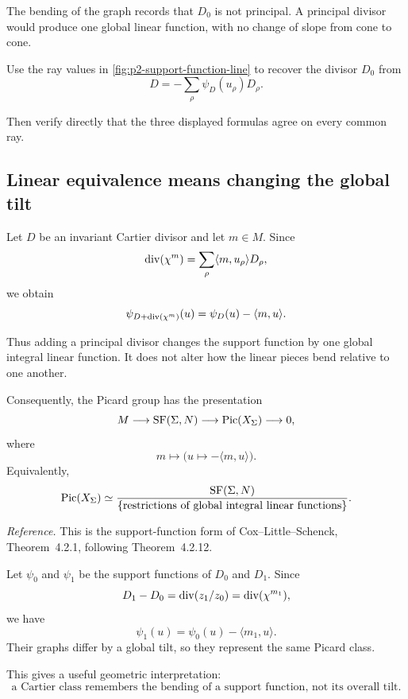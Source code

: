 The bending of the graph records that \(D_0\) is not principal. A
principal divisor would produce one global linear function, with no
change of slope from cone to cone.

\begin{pauseandthink}
Use the ray values in
\cref{fig:p2-support-function-line} to recover the divisor \(D_0\)
from
\[
D=-\sum_\rho\psi_D(u_\rho)D_\rho.
\]

Then verify directly that the three displayed formulas agree on every
common ray.
\end{pauseandthink}

\subsection{Linear equivalence means changing the global tilt}

Let \(D\) be an invariant Cartier divisor and let \(m\in M\). Since
\[
\operatorname{div}(\chi^{m})
=
\sum_\rho\langle m,u_\rho\rangle D_\rho,
\]
we obtain
\[
\psi_{D+\operatorname{div}(\chi^{m})}(u)
=
\psi_D(u)-\langle m,u\rangle.
\]

Thus adding a principal divisor changes the support function by one
global integral linear function. It does not alter how the linear
pieces bend relative to one another.

Consequently, the Picard group has the presentation
\[
M
\longrightarrow
\operatorname{SF}(\Sigma,N)
\longrightarrow
\operatorname{Pic}(X_\Sigma)
\longrightarrow
0,
\]
where
\[
m\longmapsto
\bigl(u\longmapsto-\langle m,u\rangle\bigr).
\]
Equivalently,
\[
\operatorname{Pic}(X_\Sigma)
\simeq
\frac{\operatorname{SF}(\Sigma,N)}
{\{\text{restrictions of global integral linear functions}\}}.
\]

\noindent
\textit{Reference.}
This is the support-function form of Cox--Little--Schenck,
Theorem~4.2.1, following Theorem~4.2.12.

\begin{example}
Let \(\psi_0\) and \(\psi_1\) be the support functions of \(D_0\) and
\(D_1\). Since
\[
D_1-D_0
=
\operatorname{div}(z_1/z_0)
=
\operatorname{div}(\chi^{m_1}),
\]
we have
\[
\psi_1(u)
=
\psi_0(u)-\langle m_1,u\rangle.
\]
Their graphs differ by a global tilt, so they represent the same
Picard class.
\end{example}

This gives a useful geometric interpretation:
\[
\boxed{
\text{a Cartier class remembers the bending of a support function,
not its overall tilt.}
}
\]

